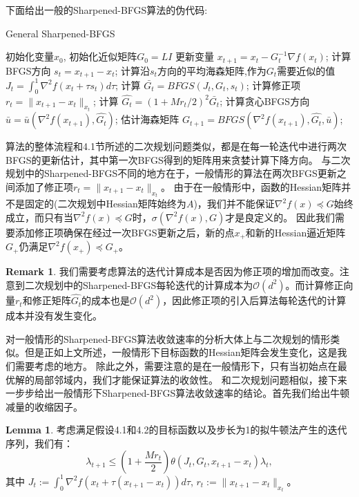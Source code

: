 \documentclass[a4paper,twoside,AutoFakeBold]{article}
\theoremstyle{definition}
\newtheorem{lema2}{{Lemma}}
\newtheorem{remark2}{{Remark}}
\begin{document}
下面给出一般的Sharpened-BFGS算法的伪代码:
\begin{algorithm}[H]\xiaosi
    \caption{\xiaosi General Sharpened-BFGS}
    \begin{algorithmic}{\label{algorithm:2}
        \REQUIRE 初始化变量$x_0$, 初始化近似矩阵$G_0=LI$
            \STATE 更新变量 $x_{t+1}=x_t-G_t^{-1}\nabla f(x_t)$;
            \STATE 计算BFGS方向 $s_t=x_{t+1}-x_t$;
            \STATE 计算沿$s_t$方向的平均海森矩阵,作为$G_t$需要近似的值 $J_t=\int_0^1\nabla^2f(x_t+\tau s_t)d\tau$;
            \STATE 计算 $\bar{G_t}=BFGS(J_t,G_t,s_t)$;
            \STATE 计算修正项 $r_t = \|x_{t + 1} - x_{t}\|_{x_t}$;
            \STATE 计算 $\hat{G_t} = (1 + {Mr_t}/{2})^2\bar{G_t}$;
            \STATE 计算贪心BFGS方向$\bar{u} = \bar{u}(\nabla^2{f(x_{t + 1})}, \hat{G_t})$;
            \STATE 估计海森矩阵 $G_{t + 1} = BFGS(\nabla^2{f(x_{t + 1})}, \hat{G_t}, \bar{u})$;
        \ENDFOR}
    \end{algorithmic}
\end{algorithm}
算法的整体流程和4.1节所述的二次规划问题类似，都是在每一轮迭代中进行两次BFGS的更新估计，其中第一次BFGS得到的矩阵用来贪婪计算下降方向。
与二次规划中的Sharpened-BFGS不同的地方在于，一般情形的算法在两次BFGS更新之间添加了修正项$r_t=\|x_{t + 1} - x_{t}\|_{x_t}$。
由于在一般情形中，函数的Hessian矩阵并不是固定的(二次规划中Hessian矩阵始终为$A$)，我们并不能保证$\nabla^2 f(x)\preceq G$始终成立，而只有当$\nabla^2 f(x)\preceq G$时，$\sigma (\nabla^2 f(x),G)$才是良定义的。
因此我们需要添加修正项确保在经过一次BFGS更新之后，新的点$x_{+}$和新的Hessian逼近矩阵$G_{+}$仍满足$\nabla^2 f(x_{+})\preceq G_{+}$。
\begin{remark2}
    我们需要考虑算法的迭代计算成本是否因为修正项的增加而改变。注意到二次规划中的Sharpened-BFGS每轮迭代的计算成本为$\mathcal{O}(d^2)$。而计算修正向量$r_t$和修正矩阵$\hat{G_t}$的成本也是$\mathcal{O}(d^2)$，因此修正项的引入后算法每轮迭代的计算成本并没有发生变化。
\end{remark2}

对一般情形的Sharpened-BFGS算法收敛速率的分析大体上与二次规划的情形类似。但是正如上文所述，一般情形下目标函数的Hessian矩阵会发生变化，这是我们需要考虑的地方。
除此之外，需要注意的是在一般情形下，只有当初始点在最优解的局部邻域内，我们才能保证算法的收敛性。
和二次规划问题相似，接下来一步步给出一般情形下Sharpened-BFGS算法收敛速率的结论。首先我们给出牛顿减量的收缩因子。

\begin{lema2}
    考虑满足假设4.1和4.2的目标函数以及步长为1的拟牛顿法产生的迭代序列，我们有：
    \begin{equation}
        \lambda_{t+1} \leq \left(1 + \frac{Mr_t}{2}\right)\theta(J_t, G_t, x_{t + 1} - x_{t})\lambda_t,
    \end{equation}
    其中 $J_t := \int_{0}^{1}\nabla^2{f(x_t + \tau(x_{t + 1} - x_{t}))d\tau}$, $r_t := \|x_{t+1} - x_t\|_{x_t}$。
\end{lema2}
\end{document}
